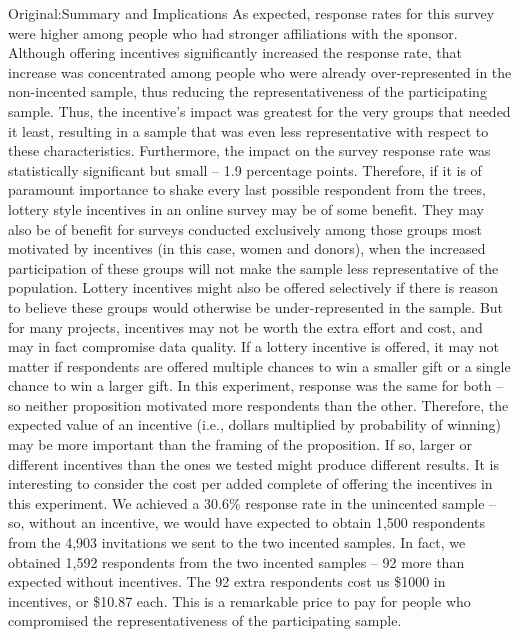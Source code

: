 \documentclass[12pt]{article}
\begin{document}
Original:Summary and Implications
As expected, response rates for this survey were higher among people who had stronger affiliations with the sponsor.  Although offering incentives significantly increased the response rate, that increase was concentrated among people who were already over-represented in the non-incented sample, thus reducing the representativeness of the participating sample.  Thus, the incentive’s impact was greatest for the very groups that needed it least, resulting in a sample that was even less representative with respect to these characteristics.
Furthermore, the impact on the survey response rate was statistically significant but small – 1.9 percentage points.  Therefore, if it is of paramount importance to shake every last possible respondent from the trees, lottery style incentives in an online survey may be of some benefit.  They may also be of benefit for surveys conducted exclusively among those groups most motivated by incentives (in this case, women and donors), when the increased participation of these groups will not make the sample less representative of the population.  Lottery incentives might also be offered selectively if there is reason to believe these groups would otherwise be under-represented in the sample.  But for many projects, incentives may not be worth the extra effort and cost, and may in fact compromise data quality.
	If a lottery incentive is offered, it may not matter if respondents are offered multiple chances to win a smaller gift or a single chance to win a larger gift.  In this experiment, response was the same for both – so neither proposition motivated more respondents than the other.  Therefore, the expected value of an incentive (i.e., dollars multiplied by probability of winning) may be more important than the framing of the proposition.  If so, larger or different incentives than the ones we tested might produce different results.  
It is interesting to consider the cost per added complete of offering the incentives in this experiment.  We achieved a 30.6\% response rate in the unincented sample – so, without an incentive, we would have expected to obtain 1,500 respondents from the 4,903 invitations we sent to the two incented samples.  In fact, we obtained 1,592 respondents from the two incented samples – 92 more than expected without incentives.  The 92 extra respondents cost us \$1000 in incentives, or \$10.87 each.  This is a remarkable price to pay for people who compromised the representativeness of the participating sample.
\end{document}
